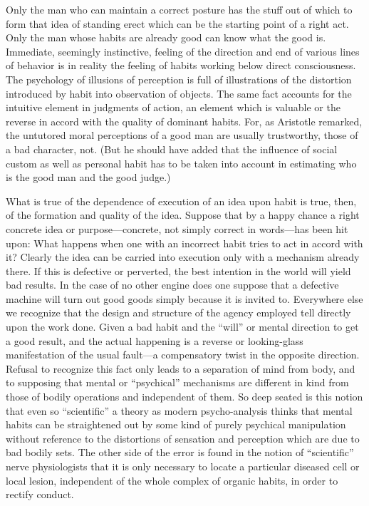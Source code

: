 \documentclass[12pt]{article}
\begin{document}
Only the man who can maintain a correct posture
has the stuff out of which to form that idea of standing
erect which can be the starting point of a right act.
Only the man whose habits are already good can know
what the good is. Immediate, seemingly instinctive,
feeling of the direction and end of various lines of behavior
is in reality the feeling of habits working below
direct consciousness. The psychology of illusions of
perception is full of illustrations of the distortion introduced
by habit into observation of objects. The
same fact accounts for the intuitive element in judgments
of action, an element which is valuable or the
reverse in accord with the quality of dominant habits.
For, as Aristotle remarked, the untutored moral perceptions
of a good man are usually trustworthy, those
of a bad character, not. (But he should have added
that the influence of social custom as well as personal
habit has to be taken into account in estimating who
is the good man and the good judge.)

What is true of the dependence of execution of an
idea upon habit is true, then, of the formation and
quality of the idea. Suppose that by a happy chance
a right concrete idea or purpose---concrete, not simply
correct in words---has been hit upon: What happens
when one with an incorrect habit tries to act in accord
with it? Clearly the idea can be carried into execution
only with a mechanism already there. If this is defective
or perverted, the best intention in the world will
yield bad results. In the case of no other engine does
one suppose that a defective machine will turn out good
goods simply because it is invited to. Everywhere else
we recognize that the design and structure of the agency
employed tell directly upon the work done. Given a
bad habit and the ``will'' or mental direction to get a
good result, and the actual happening is a reverse or
looking-glass manifestation of the usual fault---a compensatory
twist in the opposite direction. Refusal
to recognize this fact only leads to a separation of mind
from body, and to supposing that mental or ``psychical''
mechanisms are different in kind from those of
bodily operations and independent of them. So deep
seated is this notion that even so ``scientific'' a theory
as modern psycho-analysis thinks that mental habits
can be straightened out by some kind of purely psychical
manipulation without reference to the distortions
of sensation and perception which are due to bad bodily
sets. The other side of the error is found in the notion
of ``scientific'' nerve physiologists that it is only necessary
to locate a particular diseased cell or local lesion,
independent of the whole complex of organic habits, in
order to rectify conduct.
\end{document}
